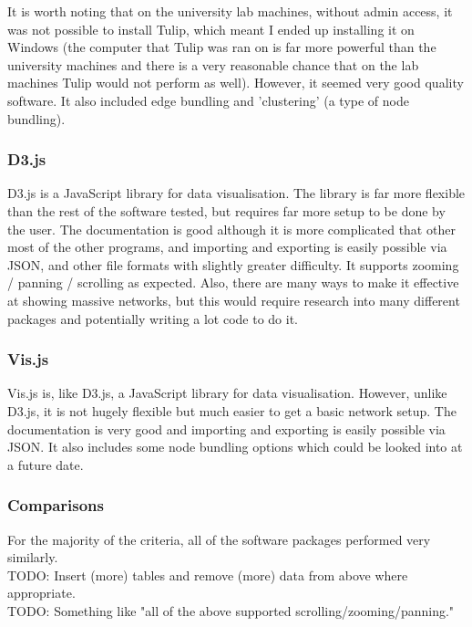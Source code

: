 \documentclass[../dissertation.tex]{subfiles}
\begin{document}
It is worth noting that on the university lab machines, without admin access, it was not possible to install Tulip, which meant I ended up installing it on Windows (the computer that Tulip was ran on is far more powerful than the university machines and there is a very reasonable chance that on the lab machines Tulip would not perform as well). However, it seemed very good quality software. It also included edge bundling and 'clustering' (a type of node bundling).

\subsubsection{D3.js}

D3.js is a JavaScript library for data visualisation. The library is far more flexible than the rest of the software tested, but requires far more setup to be done by the user. The documentation is good although it is more complicated that other most of the other programs, and importing and exporting is easily possible via JSON, and other file formats with slightly greater difficulty. It supports zooming / panning / scrolling as expected. Also, there are many ways to make it effective at showing massive networks, but this would require research into many different packages and potentially writing a lot code to do it.

\subsubsection{Vis.js}

Vis.js is, like D3.js, a JavaScript library for data visualisation. However, unlike D3.js, it is not hugely flexible but much easier to get a basic network setup. The documentation is very good and importing and exporting is easily possible via JSON. It also includes some node bundling options which could be looked into at a future date.

\subsubsection{Comparisons}

For the majority of the criteria, all of the software packages performed very similarly. 
\\
TODO: Insert (more) tables and remove (more) data from above where appropriate.
\\
TODO: Something like "all of the above supported scrolling/zooming/panning."
\end{document}

